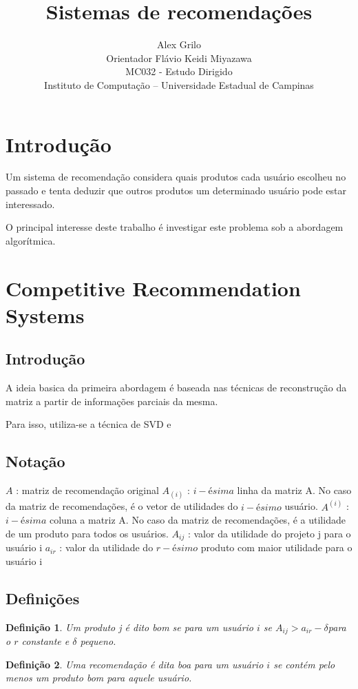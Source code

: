 \documentclass[a4paper,10pt]{article}
\title{Sistemas de recomendações}
\author{Alex Grilo \\ Orientador Flávio Keidi Miyazawa\\ MC032 - Estudo Dirigido \\ \normalsize{Instituto de Computação -- Universidade Estadual de Campinas}}
\begin{document}
\maketitle

\newtheorem{definicao}{Definição}
\newtheorem{lema}{Lema}
\newtheorem{coro}{Corolário}
\newtheorem{teo}{Teorema}


\section{Introdução}

Um sistema de recomendação considera quais produtos cada usuário
escolheu no passado e tenta deduzir que outros produtos um determinado
usuário pode estar interessado. 

O principal interesse deste trabalho é investigar este problema sob a
abordagem algorítmica.

\section{Competitive Recommendation Systems}


\subsection{Introdução}
A ideia basica da primeira abordagem é baseada nas técnicas de 
reconstru\c{c}\~ao da matriz a partir de informa\c{c}\~oes parciais
da mesma. 

Para isso, utiliza-se a técnica de SVD e 

\subsection{Notação}

$A$ : matriz de recomendação original
$A_{(i)}$ : $i-ésima$ linha da matriz A. No caso da matriz de recomendações, é o vetor de utilidades do $i-ésimo$ usuário.
$A^{(i)}$ : $i-ésima$ coluna a matriz A. No caso da matriz de recomendações, é a utilidade de um produto para todos os usuários.
$A_{ij}$ : valor da utilidade do projeto j para o usuário i
$a_{ir}$ : valor da utilidade do $r-ésimo$ produto com maior utilidade para o usuário i 

\subsection{Definições}


\begin{definicao} \label{definicao:box} Um produto j é dito bom se para um usuário $i$ se $A_{ij} > a_{ir} - \delta$para o $r$ constante e $\delta$ pequeno.
\end{definicao}
\begin{definicao} \label{definicao:box}Uma recomendação é dita boa para um usuário $i$ se contém pelo menos um produto bom para aquele usuário.
\end{definicao}
\end{document}

